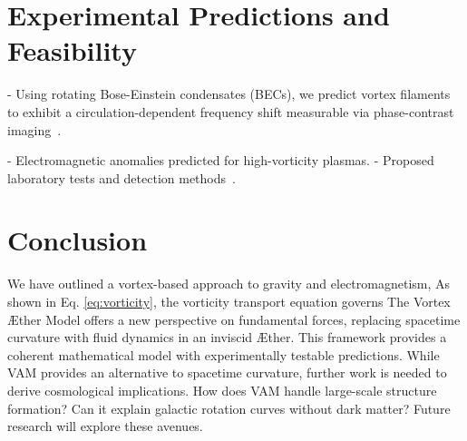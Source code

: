 \documentclass[a4paper,10pt]{article}
\begin{document}
    \section{Experimental Predictions and Feasibility}\label{sec:experimental-predictions-and-feasibility}
    - Using rotating Bose-Einstein condensates (BECs), we predict vortex filaments to exhibit a circulation-dependent frequency shift measurable via phase-contrast imaging~\cite{kleckner2013}.

    - Electromagnetic anomalies predicted for high-vorticity plasmas.
    - Proposed laboratory tests and detection methods~\cite{kleckner2013, vinen2024, podkletnov2007, orlandi2021}.

    \section{Conclusion}\label{sec:conclusion}
    We have outlined a vortex-based approach to gravity and electromagnetism, As shown in Eq. \eqref{eq:vorticity}, the vorticity transport equation governs  The Vortex \AE ther Model offers a new perspective on fundamental forces,
    replacing spacetime curvature with fluid dynamics in an inviscid \AE ther.
    This framework provides a coherent mathematical model with experimentally testable predictions.
    While VAM provides an alternative to spacetime curvature, further work is needed to derive cosmological implications.
    How does VAM handle large-scale structure formation?
    Can it explain galactic rotation curves without dark matter?
    Future research will explore these avenues.
\end{document}
